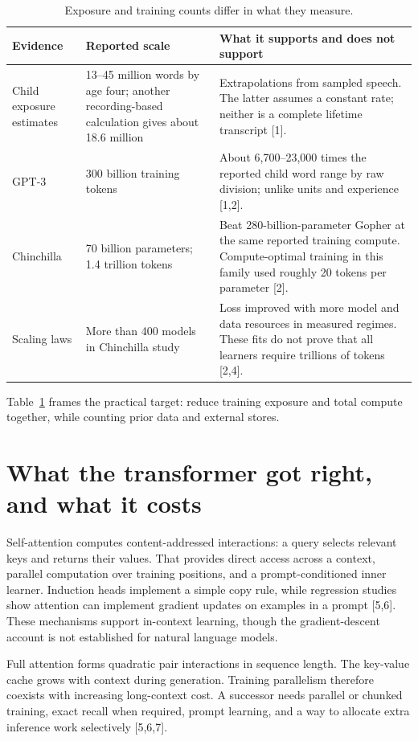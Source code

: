 \begin{table}[ht]
\centering\small
\begin{tabular}{p{3.25cm}p{3cm}p{6.2cm}}
\toprule
Evidence & Reported scale & What it supports and does not support \\
\midrule
Child exposure estimates & 13--45 million words by age four; another recording-based calculation gives about 18.6 million & Extrapolations from sampled speech. The latter assumes a constant rate; neither is a complete lifetime transcript [1]. \\
GPT-3 & 300 billion training tokens & About 6,700--23,000 times the reported child word range by raw division; unlike units and experience [1,2]. \\
Chinchilla & 70 billion parameters; 1.4 trillion tokens & Beat 280-billion-parameter Gopher at the same reported training compute. Compute-optimal training in this family used roughly 20 tokens per parameter [2]. \\
Scaling laws & More than 400 models in Chinchilla study & Loss improved with more model and data resources in measured regimes. These fits do not prove that all learners require trillions of tokens [2,4]. \\
\bottomrule
\end{tabular}
\caption{Exposure and training counts differ in what they measure.}
\label{tab:scale}
\end{table}
Table~\ref{tab:scale} frames the practical target: reduce training exposure and total compute together, while counting prior data and external stores.

\section{What the transformer got right, and what it costs}
Self-attention computes content-addressed interactions: a query selects relevant keys and returns their values. That provides direct access across a context, parallel computation over training positions, and a prompt-conditioned inner learner. Induction heads implement a simple copy rule, while regression studies show attention can implement gradient updates on examples in a prompt [5,6]. These mechanisms support in-context learning, though the gradient-descent account is not established for natural language models.

Full attention forms quadratic pair interactions in sequence length. The key-value cache grows with context during generation. Training parallelism therefore coexists with increasing long-context cost. A successor needs parallel or chunked training, exact recall when required, prompt learning, and a way to allocate extra inference work selectively [5,6,7].

